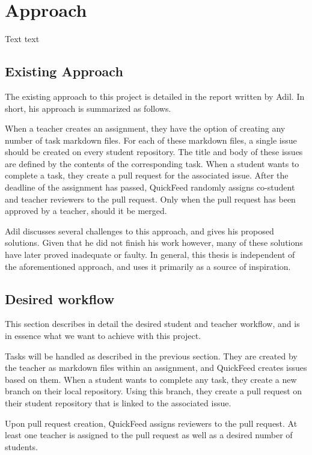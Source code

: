 
\chapter{Approach}
\label{ch:approach}

Text text
 
\section{Existing Approach}

The existing approach to this project is detailed in the report written by Adil.
In short, his approach is summarized as follows.

When a teacher creates an assignment, they have the option of creating any number of task markdown files.
For each of these markdown files, a single issue should be created on every student repository.
The title and body of these issues are defined by the contents of the corresponding task.
When a student wants to complete a task, they create a pull request for the associated issue.
After the deadline of the assignment has passed, QuickFeed randomly assigns co-student and teacher reviewers to the pull request. 
Only when the pull request has been approved by a teacher, should it be merged.

Adil discusses several challenges to this approach, and gives his proposed solutions.
Given that he did not finish his work however, many of these solutions have later proved inadequate or faulty.
In general, this thesis is independent of the aforementioned approach, and uses it primarily as a source of inspiration.

\section{Desired workflow}

This section describes in detail the desired student and teacher workflow, and is in essence what we want to achieve with this project.

Tasks will be handled as described in the previous section.
They are created by the teacher as markdown files within an assignment, and QuickFeed creates issues based on them.
When a student wants to complete any task, they create a new branch on their local repository.
Using this branch, they create a pull request on their student repository that is linked to the associated issue.

Upon pull request creation, QuickFeed assigns reviewers to the pull request.
At least one teacher is assigned to the pull request as well as a desired number of students.

